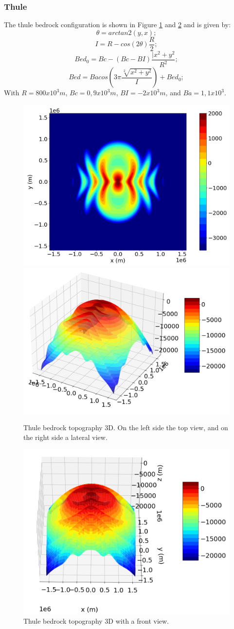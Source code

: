 \documentclass[a4paper,12pt]{article}
\begin{document}
\subsubsection{Thule}
 The thule bedrock configuration is shown in Figure \ref{Thule_3D} and \ref{Thule_3D1} and is given by:
	\begin{equation}
		\theta=arctan2(y,x);
	\end{equation}
	\begin{equation}
		I=R-cos(2\theta)\frac{R}{2};
	\end{equation}
	\begin{equation}
		Bed_0=Bc-(Bc-BI)\frac{|x^2+y^2}{R^2};
	\end{equation}
	\begin{equation}
		Bed=Bacos(3\pi\frac{\sqrt[2]{x^2+y^2}}{I})+Bed_0;
	\end{equation}
	With $R=800 x 10^3 m$, $Bc=0,9 x 10^3 m$, $BI=-2 x 10^3 m$, and $Ba=1,1 x 10^3$.
	\begin{figure}[!h]
		\centering
		\includegraphics[width=0.45\linewidth]{../fig/Thule_2D}
		\includegraphics[width=0.45\linewidth]{../fig/Thule_3D}
		\caption{Thule bedrock topography 3D. On the left side the top view, and on the right side a lateral view.}
		\label{Thule_3D}
	\end{figure}
	\begin{figure}[!h]
	\centering
	\includegraphics[width=0.45\linewidth]{../fig/Thule_3D1}
	\caption{Thule bedrock topography 3D with a front view.}
	\label{Thule_3D1}
\end{figure}
\end{document}
